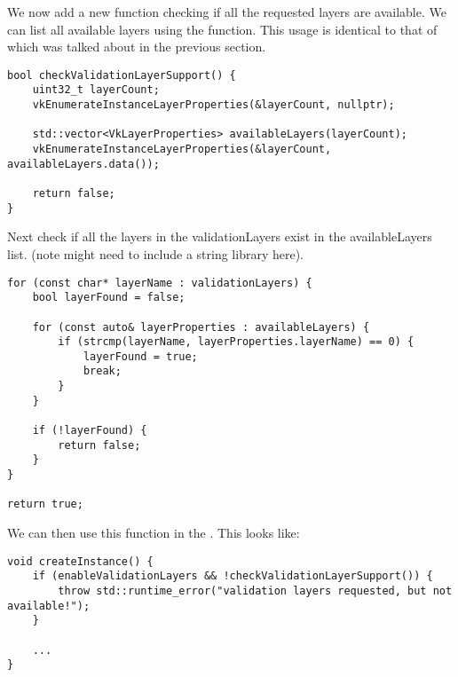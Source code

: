 \par We now add a new function  checking if all the requested layers are available. We can list all available layers using the  function. This usage is identical to that of  which was talked about in the previous section.

\begin{center}
    \begin{minipage}{0.95\linewidth}
\begin{lstlisting}
bool checkValidationLayerSupport() {
    uint32_t layerCount;
    vkEnumerateInstanceLayerProperties(&layerCount, nullptr);

    std::vector<VkLayerProperties> availableLayers(layerCount);
    vkEnumerateInstanceLayerProperties(&layerCount, availableLayers.data());

    return false;
}
\end{lstlisting}
\end{minipage}
\end{center}

\par Next check if all the layers in the validationLayers exist in the availableLayers list. (note might need to include a string library here).

\begin{center}
    \begin{minipage}{0.95\linewidth}
\begin{lstlisting}
for (const char* layerName : validationLayers) {
    bool layerFound = false;

    for (const auto& layerProperties : availableLayers) {
        if (strcmp(layerName, layerProperties.layerName) == 0) {
            layerFound = true;
            break;
        }
    }

    if (!layerFound) {
        return false;
    }
}

return true;
\end{lstlisting}
\end{minipage}
\end{center}

\par We can then use this function in the . This looks like:

\begin{center}
    \begin{minipage}{0.95\linewidth}
\begin{lstlisting}
void createInstance() {
    if (enableValidationLayers && !checkValidationLayerSupport()) {
        throw std::runtime_error("validation layers requested, but not available!");
    }

    ...
}
\end{lstlisting}
\end{minipage}
\end{center}


